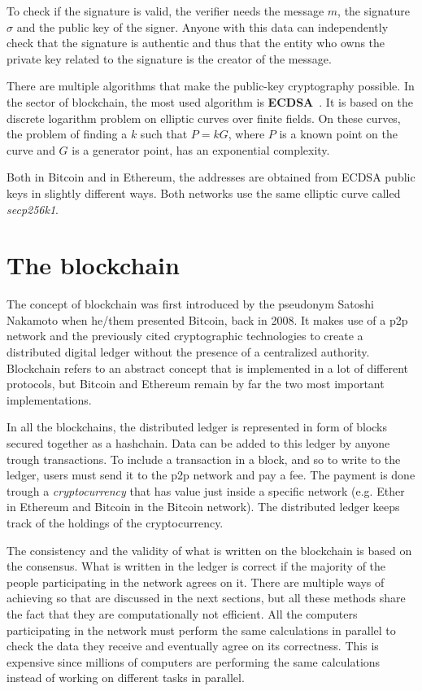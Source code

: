To check if the signature is valid, the verifier needs the message $m$, the signature $\sigma$ and the public key of the signer. Anyone with this data can independently check that the signature is authentic and thus that the entity who owns the private key related to the signature is the creator of the message. 

There are multiple algorithms that make the public-key cryptography possible. In the sector of blockchain, the most used algorithm is \textbf{ECDSA}~\cite{ecdsa}. It is based on the discrete logarithm problem on elliptic curves over finite fields. On these curves, the problem of finding a $k$ such that $P=kG$, where $P$ is a known point on the curve and $G$ is a generator point, has an exponential complexity. 

Both in Bitcoin and in Ethereum, the addresses are obtained from ECDSA public keys in slightly different ways. Both networks use the same elliptic curve called \textit{secp256k1}.



\section{The blockchain}

The concept of blockchain was first introduced by the pseudonym Satoshi Nakamoto when he/them presented Bitcoin, back in 2008. It makes use of a p2p network and the previously cited cryptographic technologies to create a distributed digital ledger without the presence of a centralized authority. Blockchain refers to an abstract concept that is implemented in a lot of different protocols, but Bitcoin and Ethereum remain by far the two most important implementations.

In all the blockchains, the distributed ledger is represented in form of blocks secured together as a hashchain. Data can be added to this ledger by anyone trough transactions. To include a transaction in a block, and so to write to the ledger, users must send it to the p2p network and pay a fee. The payment is done trough a \textit{cryptocurrency} that has value just inside a specific network (e.g. Ether in Ethereum and Bitcoin in the Bitcoin network). The distributed ledger keeps track of the holdings of the cryptocurrency.

The consistency and the validity of what is written on the blockchain is based on the consensus. What is written in the ledger is correct if the majority of the people participating in the network agrees on it. There are multiple ways of achieving so that are discussed in the next sections, but all these methods share the fact that they are computationally not efficient. All the computers participating in the network must perform the same calculations in parallel to check the data they receive and eventually agree on its correctness. This is expensive since millions of computers are performing the same calculations instead of working on different tasks in parallel. 

